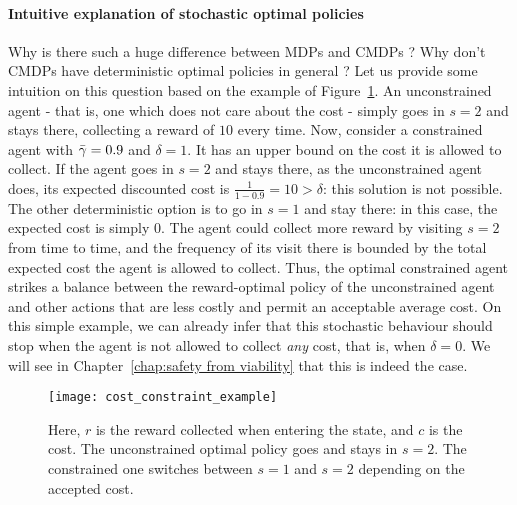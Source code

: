 		\paragraph{Intuitive explanation of stochastic optimal policies} Why is there such a huge difference between MDPs and CMDPs ? Why don't CMDPs have deterministic optimal policies in general ? Let us provide some intuition on this question based on the example of Figure~\ref{fig:cmdps stochastic optimal}. An unconstrained agent - that is, one which does not care about the cost - simply goes in $s=2$ and stays there, collecting a reward of $10$ every time. Now, consider a constrained agent with $\bar{\gamma} = 0.9$ and $\delta = 1$. It has an upper bound on the cost it is allowed to collect. If the agent goes in $s=2$ and stays there, as the unconstrained agent does, its expected discounted cost is $\frac{1}{1 - 0.9} = 10 > \delta$: this solution is not possible. The other deterministic option is to go in $s=1$ and stay there: in this case, the expected cost is simply $0$. The agent could collect more reward by visiting $s=2$ from time to time, and the frequency of its visit there is bounded by the total expected cost the agent is allowed to collect. Thus, the optimal constrained agent strikes a balance between the reward-optimal policy of the unconstrained agent and other actions that are less costly and permit an acceptable average cost. On this simple example, we can already infer that this stochastic behaviour should stop when the agent is not allowed to collect\emph{ any} cost, that is, when $\delta = 0$. We will see in Chapter~\ref{chap:safety from viability} that this is indeed the case.
		\begin{figure}
			\centering
			\texttt{[image: cost\_constraint\_example]}
			\caption{Here, $r$ is the reward collected when entering the state, and $c$ is the cost. The unconstrained optimal policy goes and stays in $s=2$. The constrained one switches between $s=1$ and $s=2$ depending on the accepted cost.}
			\label{fig:cmdps stochastic optimal}
		\end{figure} 
		
